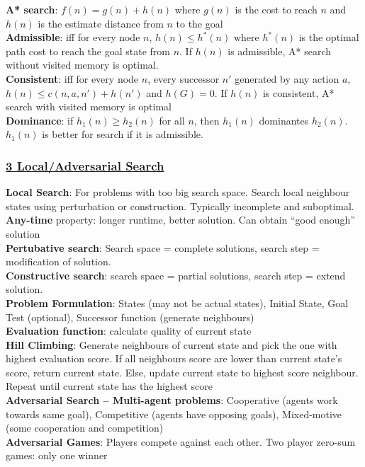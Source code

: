 \documentclass{article}
\begin{document}
\begin{multicols*}{3}
\textbf{A* search}: $f(n)=g(n)+h(n)$ where $g(n)$ is the cost to reach $n$ and $h(n)$ is the estimate distance from $n$ to the goal\\
\textbf{Admissible}: iff for every node $n$, $h(n)\leq h^*(n)$ where $h^*(n)$ is the optimal path cost to reach the goal state from $n$. If $h(n)$ is admissible, A* search without visited memory is optimal. \\
\textbf{Consistent}: iff for every node $n$, every successor $n'$ generated by any action $a$, $h(n)\leq c(n,a,n')+h(n')$ and $h(G)=0$. If $h(n)$ is consistent, A* search with visited memory is optimal \\
\textbf{Dominance}: if $h_1(n)\geq h_2(n)$ for all $n$, then $h_1(n)$ dominantes $h_2(n)$. $h_1(n)$ is better for search if it is admissible. 
\subsubsection*{\underline{3 Local/Adversarial Search}}
\textbf{Local Search}: For problems with too big search space. Search local neighbour states using perturbation or construction. Typically incomplete and suboptimal. \textbf{Any-time} property: longer runtime, better solution. Can obtain ``good enough'' solution \\
\textbf{Pertubative search}: Search space = complete solutions, search step = modification of solution. \\
\textbf{Constructive search}: search space = partial solutions, search step = extend solution. \\
\textbf{Problem Formulation}: States (may not be actual states), Initial State, Goal Test (optional), Successor function (generate neighbours) \\
\textbf{Evaluation function}: calculate quality of current state\\
\textbf{Hill Climbing}: Generate neighbours of current state and pick the one with highest evaluation score. If all neighbours score are lower than current state's score, return current state. Else, update current state to highest score neighbour. Repeat until current state has the highest score\\
\textbf{Adversarial Search – Multi-agent problems}: Cooperative (agents work towards same goal), Competitive (agents have opposing goals), Mixed-motive (some cooperation and competition)\\
\textbf{Adversarial Games}: Players compete against each other. Two player zero-sum games: only one winner \\

\end{multicols*}
\end{document}

